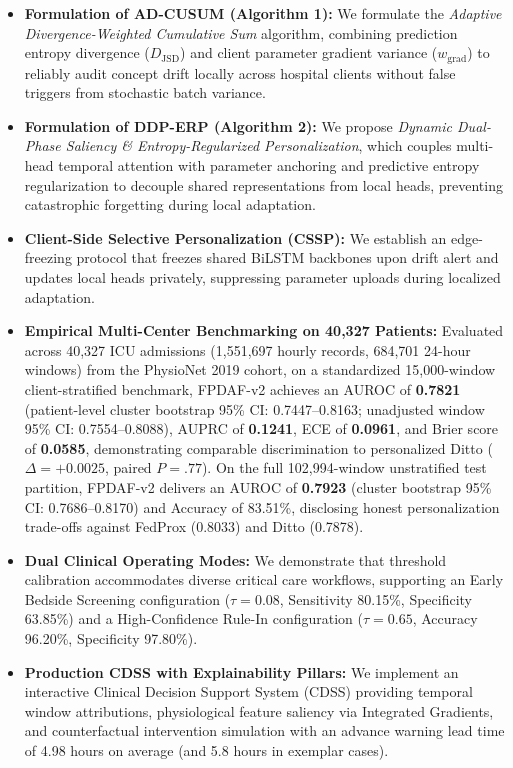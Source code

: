 \documentclass[final,5p,times,twocolumn]{elsarticle}
\begin{document}
\begin{itemize}
    \item \textbf{Formulation of AD-CUSUM (Algorithm 1):} We formulate the \textit{Adaptive Divergence-Weighted Cumulative Sum} algorithm, combining prediction entropy divergence ($D_{\text{JSD}}$) and client parameter gradient variance ($w_{\text{grad}}$) to reliably audit concept drift locally across hospital clients without false triggers from stochastic batch variance.
    \item \textbf{Formulation of DDP-ERP (Algorithm 2):} We propose \textit{Dynamic Dual-Phase Saliency \& Entropy-Regularized Personalization}, which couples multi-head temporal attention with parameter anchoring and predictive entropy regularization to decouple shared representations from local heads, preventing catastrophic forgetting during local adaptation.
    \item \textbf{Client-Side Selective Personalization (CSSP):} We establish an edge-freezing protocol that freezes shared BiLSTM backbones upon drift alert and updates local heads privately, suppressing parameter uploads during localized adaptation.
        \item \textbf{Empirical Multi-Center Benchmarking on 40,327 Patients:} Evaluated across 40,327 ICU admissions (1,551,697 hourly records, 684,701 24-hour windows) from the PhysioNet 2019 cohort, on a standardized 15,000-window client-stratified benchmark, FPDAF-v2 achieves an AUROC of \textbf{0.7821} (patient-level cluster bootstrap 95\% CI: 0.7447--0.8163; unadjusted window 95\% CI: 0.7554--0.8088), AUPRC of \textbf{0.1241}, ECE of \textbf{0.0961}, and Brier score of \textbf{0.0585}, demonstrating comparable discrimination to personalized Ditto ($\Delta = +0.0025$, paired $P = .77$). On the full 102,994-window unstratified test partition, FPDAF-v2 delivers an AUROC of \textbf{0.7923} (cluster bootstrap 95\% CI: 0.7686--0.8170) and Accuracy of 83.51\%, disclosing honest personalization trade-offs against FedProx (0.8033) and Ditto (0.7878).
\item \textbf{Dual Clinical Operating Modes:} We demonstrate that threshold calibration accommodates diverse critical care workflows, supporting an Early Bedside Screening configuration ($\tau=0.08$, Sensitivity 80.15\%, Specificity 63.85\%) and a High-Confidence Rule-In configuration ($\tau=0.65$, Accuracy 96.20\%, Specificity 97.80\%).
    \item \textbf{Production CDSS with Explainability Pillars:} We implement an interactive Clinical Decision Support System (CDSS) providing temporal window attributions, physiological feature saliency via Integrated Gradients, and counterfactual intervention simulation with an advance warning lead time of 4.98 hours on average (and 5.8 hours in exemplar cases).
\end{itemize}
\end{document}
